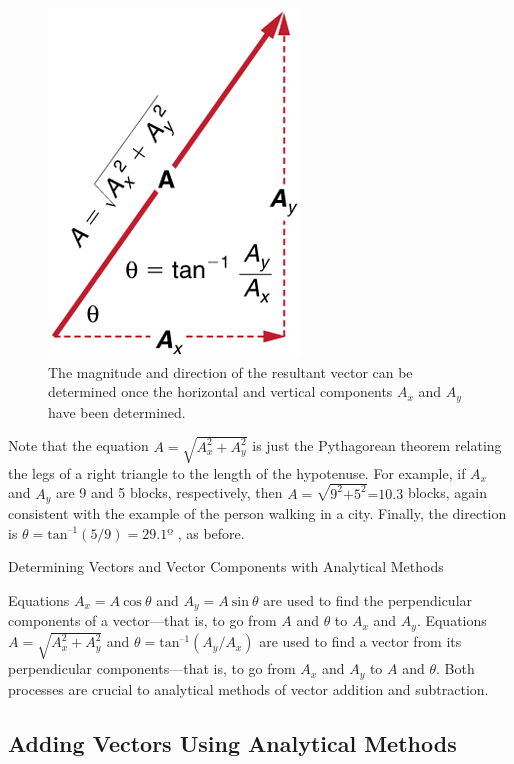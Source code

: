 \documentclass[
]{book}
\begin{document}
\begin{figure}
\hypertarget{import-auto-id1165298723894}{%
\centering
\includegraphics{images/Figure_03_03_04a.jpg}
\caption{The magnitude and direction of the resultant vector can be determined
once the horizontal and vertical components \(A_{x}{}\) and \(A_{y}{}\) have
been
determined.}\label{import-auto-id1165298723894}
}
\end{figure}

Note that the equation \(A = \sqrt{A_{x}^{2} + A_{y}^{2}}\) is just the
Pythagorean theorem relating the legs of a right triangle to the length
of the hypotenuse. For example, if \(A_{x}{}\) and \(A_{y}{}\) are 9 and 5
blocks, respectively, then
\({{A = \sqrt{9^{2}\text{+5}^{2}}}\text{=10}\text{.}3}{}\) blocks, again
consistent with the example of the person walking in a city. Finally,
the direction is \({\theta = \text{tan}^{–1}}(\text{5/9})=29.1º\) , as
before.

\hypertarget{fs-id1607685}{}
Determining Vectors and Vector Components with Analytical Methods

Equations \({{A_{x} = A}\ \text{cos}\ \theta}{}\) and
\({{A_{y} = A}\ \text{sin}\ \theta}{}\) are used to find the perpendicular
components of a vector---that is, to go from \(A{}\) and \(\theta{}\) to
\(A_{x}{}\) and \(A_{y}{}\). Equations
\({A = \sqrt{A_{x}^{2} + A_{y}^{2}}}{}\) and
\({{\theta = \text{tan}^{\text{–1}}}({A_{y}/A_{x}})}{}\) are used to find
a vector from its perpendicular components---that is, to go from
\(A_{x}{}\) and \(A_{y}{}\) to \(A{}\) and \(\theta\). Both processes are
crucial to analytical methods of vector addition and subtraction.

\hypertarget{fs-id1461904}{}
\hypertarget{adding-vectors-using-analytical-methods}{%
\subsection{Adding Vectors Using Analytical Methods}\label{adding-vectors-using-analytical-methods}}
\end{document}
